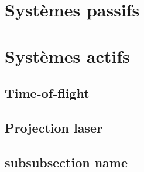 \label{sec:capteurs}

\section{Systèmes passifs}

\section{Systèmes actifs}

\subsection{Time-of-flight}

\subsection{Projection laser}

\subsection{subsubsection name}
